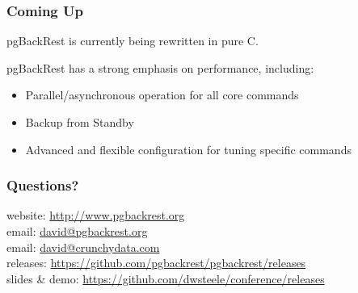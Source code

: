 \begin{frame}
    \frametitle{Coming Up}

    pgBackRest is currently being rewritten in pure C.\pause\vspace{1em}

    pgBackRest has a strong emphasis on performance, including:

    \begin{itemize}
        \item Parallel/asynchronous operation for all core commands\pause
        \item Backup from Standby\pause
        \item Advanced and flexible configuration for tuning specific commands
    \end{itemize}
\end{frame}

\begin{frame}
    \frametitle{Questions?}

    website: \url{http://www.pgbackrest.org}\\
    \vspace{1em}
    email: \href{mailto:david@pgbackrest.org}{david@pgbackrest.org} \\
    email: \href{mailto:david@crunchydata.com}{david@crunchydata.com}\\
    \vspace{1em}
    releases: \url{https://github.com/pgbackrest/pgbackrest/releases}\\
    \vspace{1em}
    slides \& demo: \url{https://github.com/dwsteele/conference/releases}\\
\end{frame}


